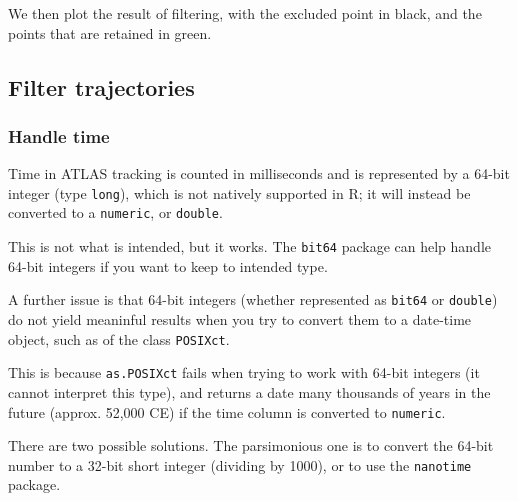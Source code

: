 \documentclass[
]{scrartcl}
\newenvironment{Shaded}{}{}
\newcommand{\CommentTok}[1]{\textcolor[rgb]{0.38,0.63,0.69}{\textit{#1}}}
\newcommand{\DataTypeTok}[1]{\textcolor[rgb]{0.56,0.13,0.00}{#1}}
\newcommand{\DecValTok}[1]{\textcolor[rgb]{0.25,0.63,0.44}{#1}}
\newcommand{\KeywordTok}[1]{\textcolor[rgb]{0.00,0.44,0.13}{\textbf{#1}}}
\newcommand{\NormalTok}[1]{#1}
\newcommand{\OperatorTok}[1]{\textcolor[rgb]{0.40,0.40,0.40}{#1}}
\newcommand{\OtherTok}[1]{\textcolor[rgb]{0.00,0.44,0.13}{#1}}
\newcommand{\StringTok}[1]{\textcolor[rgb]{0.25,0.44,0.63}{#1}}
\begin{document}
We then plot the result of filtering, with the excluded point in black, and the points that are retained in green.

\begin{Shaded}
\end{Shaded}

\hypertarget{filter-trajectories}{%
\subsection{Filter trajectories}\label{filter-trajectories}}

\hypertarget{handle-time}{%
\subsubsection{Handle time}\label{handle-time}}

Time in ATLAS tracking is counted in milliseconds and is represented by a 64-bit integer (type \texttt{long}), which is not natively supported in R; it will instead be converted to a \texttt{numeric}, or \texttt{double}.

This is not what is intended, but it works. The \texttt{bit64} package can help handle 64-bit integers if you want to keep to intended type.

A further issue is that 64-bit integers (whether represented as \texttt{bit64} or \texttt{double}) do not yield meaninful results when you try to convert them to a date-time object, such as of the class \texttt{POSIXct}.

This is because \texttt{as.POSIXct} fails when trying to work with 64-bit integers (it cannot interpret this type), and returns a date many thousands of years in the future (approx. 52,000 CE) if the time column is converted to \texttt{numeric}.

There are two possible solutions. The parsimonious one is to convert the 64-bit number to a 32-bit short integer (dividing by 1000), or to use the \texttt{nanotime} package.
\end{document}
